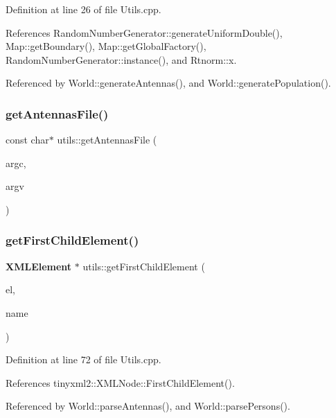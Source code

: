 Definition at line 26 of file Utils.\+cpp.



References Random\+Number\+Generator\+::generate\+Uniform\+Double(), Map\+::get\+Boundary(), Map\+::get\+Global\+Factory(), Random\+Number\+Generator\+::instance(), and Rtnorm\+::x.



Referenced by World\+::generate\+Antennas(), and World\+::generate\+Population().

\mbox{\label{namespaceutils_a20d2148f668eec93d623536d18c7dd62}} 
\subsubsection{getAntennasFile()}
{\footnotesize\ttfamily const char$\ast$ utils\+::get\+Antennas\+File (\begin{DoxyParamCaption}\item[{int}]{argc,  }\item[{char $\ast$$\ast$}]{argv }\end{DoxyParamCaption})}

\mbox{\label{namespaceutils_a6d3da5ad06700408fa8e41f3115e4c40}} 
\subsubsection{getFirstChildElement()}
{\footnotesize\ttfamily \textbf{ X\+M\+L\+Element} $\ast$ utils\+::get\+First\+Child\+Element (\begin{DoxyParamCaption}\item[{\textbf{ X\+M\+L\+Element} $\ast$}]{el,  }\item[{const char $\ast$}]{name }\end{DoxyParamCaption})\hspace{0.3cm}{\ttfamily [noexcept]}}



Definition at line 72 of file Utils.\+cpp.



References tinyxml2\+::\+X\+M\+L\+Node\+::\+First\+Child\+Element().



Referenced by World\+::parse\+Antennas(), and World\+::parse\+Persons().

\mbox{\label{namespaceutils_a7fb4a9700e2a1e31cca50ef090bf4b05}} 
